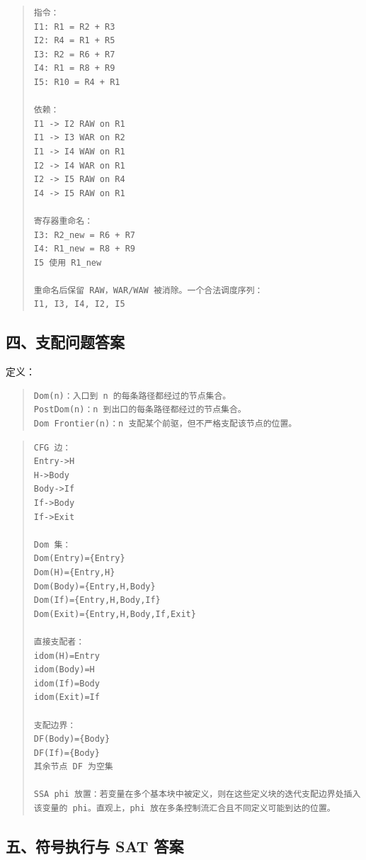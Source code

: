 \documentclass[UTF8,zihao=-4]{ctexart}
\begin{document}
\begin{quote}
\footnotesize
\begin{verbatim}
指令：
I1: R1 = R2 + R3
I2: R4 = R1 + R5
I3: R2 = R6 + R7
I4: R1 = R8 + R9
I5: R10 = R4 + R1

依赖：
I1 -> I2 RAW on R1
I1 -> I3 WAR on R2
I1 -> I4 WAW on R1
I2 -> I4 WAR on R1
I2 -> I5 RAW on R4
I4 -> I5 RAW on R1

寄存器重命名：
I3: R2_new = R6 + R7
I4: R1_new = R8 + R9
I5 使用 R1_new

重命名后保留 RAW，WAR/WAW 被消除。一个合法调度序列：
I1, I3, I4, I2, I5
\end{verbatim}
\end{quote}



\subsection{四、支配问题答案}


定义：


\begin{quote}
\footnotesize
\begin{verbatim}
Dom(n)：入口到 n 的每条路径都经过的节点集合。
PostDom(n)：n 到出口的每条路径都经过的节点集合。
Dom Frontier(n)：n 支配某个前驱，但不严格支配该节点的位置。
\end{verbatim}
\end{quote}


\begin{quote}
\footnotesize
\begin{verbatim}
CFG 边：
Entry->H
H->Body
Body->If
If->Body
If->Exit

Dom 集：
Dom(Entry)={Entry}
Dom(H)={Entry,H}
Dom(Body)={Entry,H,Body}
Dom(If)={Entry,H,Body,If}
Dom(Exit)={Entry,H,Body,If,Exit}

直接支配者：
idom(H)=Entry
idom(Body)=H
idom(If)=Body
idom(Exit)=If

支配边界：
DF(Body)={Body}
DF(If)={Body}
其余节点 DF 为空集

SSA phi 放置：若变量在多个基本块中被定义，则在这些定义块的迭代支配边界处插入该变量的 phi。直观上，phi 放在多条控制流汇合且不同定义可能到达的位置。
\end{verbatim}
\end{quote}



\subsection{五、符号执行与 SAT 答案}
\end{document}
